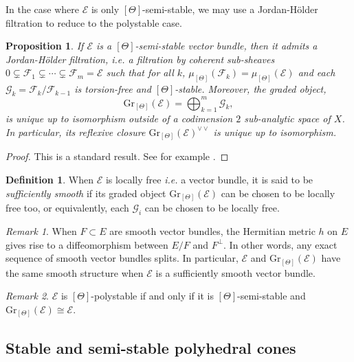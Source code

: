 \documentclass{article}
\newtheorem{proposition}[theorem]{Proposition}
\theoremstyle{remark}
\newtheorem*{remark}{Remark}
\theoremstyle{definition}
\newtheorem{definition}[theorem]{Definition}
\newcommand{\E}{\mathcal{E}}
\newcommand{\F}{\mathcal{F}}
\newcommand{\G}{\mathcal{G}}
\newcommand{\Gr}{\mathrm{Gr}}
\begin{document}
In the case where $\E$ is only $[\Theta]$-semi-stable, we may use a Jordan-Hölder filtration to reduce to the polystable case.
\begin{proposition}\label{PRO:FJH}
    If $\E$ is a $[\Theta]$-semi-stable vector bundle, then it admits a Jordan-Hölder filtration, \textit{i.e.} a filtration by coherent sub-sheaves $0 \subsetneq \F_1 \subsetneq \cdots \subsetneq \F_m = \E$ such that for all $k$, $\mu_{[\Theta]}(\F_k) = \mu_{[\Theta]}(\E)$ and each $\G_k = \F_k/\F_{k - 1}$ is torsion-free and $[\Theta]$-stable. Moreover, the graded object,
    $$
    \Gr_{[\Theta]}(\E) = \bigoplus_{k = 1}^m \G_k,
    $$
    is unique up to isomorphism outside of a codimension $2$ sub-analytic space of $X$. In particular, its reflexive closure $\Gr_{[\Theta]}(\E)^{\lor\lor}$ is unique up to isomorphism.
\end{proposition}
\begin{proof}
This is a standard result. See for example \cite[Theorem 1.6.7, Corollary 1.6.10]{Huybrechts_Lehn}.
\end{proof}

\begin{definition}
    When $\E$ is locally free \textit{i.e.} a vector bundle, it is said to be \textit{sufficiently smooth} if its graded object $\Gr_{[\Theta]}(\E)$ can be chosen to be locally free too, or equivalently, each $\G_i$ can be chosen to be locally free.
\end{definition}
\begin{remark}
    When $F \subset E$ are smooth vector bundles, the Hermitian metric $h$ on $E$ gives rise to a diffeomorphism between $E/F$ and $F^\bot$. In other words, any exact sequence of smooth vector bundles splits. In particular, $\E$ and $\Gr_{[\Theta]}(\E)$ have the same smooth structure when $\E$ is a sufficiently smooth vector bundle.
\end{remark}
\begin{remark}
    $\E$ is $[\Theta]$-polystable if and only if it is $[\Theta]$-semi-stable and $\Gr_{[\Theta]}(\E) \cong \E$.
\end{remark}

\subsection{Stable and semi-stable polyhedral cones}
\end{document}
